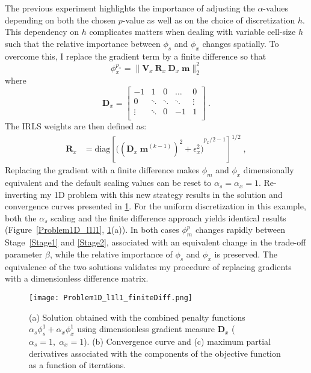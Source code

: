 The previous experiment highlights the importance of adjusting the $\alpha$-values depending on both the chosen $p$-value as well as on the choice of discretization $h$. This dependency on $h$ complicates matters when dealing with variable cell-size $h$ such that the relative importance between $\phi_s$ and $\phi_x$ changes spatially.
To overcome this, I replace the gradient term by a finite difference so that
\begin{equation}\label{phixMatrixUnit}
\phi_x^{p_x} = \| \mathbf{V}_x\:\mathbf{R}_x\:\mathbf{D}_x\;\mathbf{m} \|_2^2
\end{equation}
where
\begin{equation}\label{1D_Grad}
\mathbf{D}_x =
		\begin{bmatrix}
			-1		& 		1	& 	0		& \dots 		& 0 \\
			0 		& 	\ddots	& 	 \ddots	& \ddots 	& \vdots \\
			\vdots	& 		 \ddots	& 0	& -1 & 1\\
		 \end{bmatrix}\;.
\end{equation}
The IRLS weights are then defined as:
\begin{equation}\label{eq:Rx_w}
\begin{split}
	\mathbf{R}_x &= \text{diag} \left[{\Big( ({{\mathbf{D}_x\;\mathbf{m}}^{(k-1)}})^{2} + \epsilon_x^2 \Big)}^{p_x/2 - 1} \right]^{1/2} \;,
\end{split}
\end{equation}
Replacing the gradient with a finite difference makes $\phi_m$ and $\phi_x$ dimensionally equivalent and the default scaling values can be reset to $\alpha_s=\alpha_x=1$. Re-inverting my 1D problem with this new strategy results in the solution and convergence curves presented in \ref{Problem1D_l1l1_finiteDiff}. For the uniform discretization in this example, both the $\alpha_s$ scaling and the finite difference approach yields identical results (Figure~\ref{Problem1D_l1l1}, \ref{Problem1D_l1l1_finiteDiff}(a)). In both cases $\phi_m^p$ changes rapidly between Stage~\ref{Stage1} and \ref{Stage2}, associated with an equivalent change in the trade-off parameter $\beta$, while the relative importance of $\phi_s$ and $\phi_x$ is preserved. The equivalence of the two solutions validates my procedure of replacing gradients with a dimensionless difference matrix.
\begin{figure}
\texttt{[image: Problem1D\_l1l1\_finiteDiff.png]}
\caption{(a) Solution obtained with the combined penalty functions $\alpha_s \phi_s^1 + \alpha_x \phi_x^1$ using dimensionless gradient measure $\mathbf{D}_x$ ($\alpha_s=1,\;\alpha_x = 1$). (b) Convergence curve and (c) maximum partial derivatives associated with the components of the objective function as a function of iterations.}
\label{Problem1D_l1l1_finiteDiff}
\end{figure}


